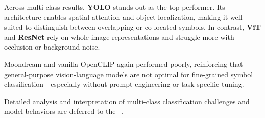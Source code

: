 





Across multi-class results, \textbf{YOLO} stands out as the top performer. Its architecture enables spatial
attention and object localization, making it well-suited to distinguish between overlapping or co-located symbols.
In contrast, \textbf{ViT} and \textbf{ResNet} rely on whole-image representations and struggle more with occlusion
or background noise.

Moondream and vanilla OpenCLIP again performed poorly, reinforcing that general-purpose vision-language models are
not optimal for fine-grained symbol classification—especially without prompt engineering or task-specific tuning.

Detailed analysis and interpretation of multi-class classification challenges and model behaviors are deferred to
the ~.